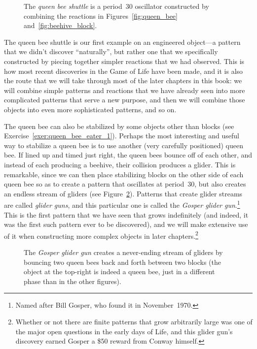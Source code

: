 \begin{figure}[!ht]
	\centering{}
	\caption{The \emph{queen bee shuttle} is a period~30 oscillator constructed by combining the reactions in Figures~\ref{fig:queen_bee} and~\ref{fig:beehive_block}.}\label{fig:queen_bee_shuttle}
\end{figure}

The queen bee shuttle is our first example on an engineered object---a pattern that we didn't discover ``naturally'', but rather one that we specifically constructed by piecing together simpler reactions that we had observed. This is how most recent discoveries in the Game of Life have been made, and it is also the route that we will take through most of the later chapters in this book: we will combine simple patterns and reactions that we have already seen into more complicated patterns that serve a new purpose, and then we will combine those objects into even more sophisticated patterns, and so on.

The queen bee can also be stabilized by some objects other than blocks (see Exercise~\ref{exer:queen_bee_eater_1}). Perhaps the most interesting and useful way to stabilize a queen bee is to use another (very carefully positioned) queen bee. If lined up and timed just right, the queen bees bounce off of each other, and instead of each producing a beehive, their collision produces a glider. This is remarkable, since we can then place stabilizing blocks on the other side of each queen bee so as to create a pattern that oscillates at period~30, but also creates an endless stream of gliders (see Figure~\ref{fig:gosper_glider_gun}). Patterns that create glider streams are called \emph{glider guns}, and this particular one is called the \emph{Gosper glider gun}.\footnote{Named after Bill Gosper, who found it in November~1970.} This is the first pattern that we have seen that grows indefinitely (and indeed, it was the first such pattern ever to be discovered), and we will make extensive use of it when constructing more complex objects in later chapters.\footnote{Whether or not there are finite patterns that grow arbitrarily large was one of the major open questions in the early days of Life, and this glider gun's discovery earned Gosper a \$50 reward from Conway himself.}

\begin{figure}[!htb]
	\centering{}
	\caption{The \emph{Gosper glider gun} creates a never-ending stream of gliders by bouncing two queen bees back and forth between two blocks (the object at the top-right is indeed a queen bee, just in a different phase than in the other figures).}\label{fig:gosper_glider_gun}
\end{figure}


